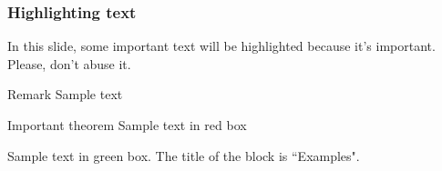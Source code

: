 \documentclass{beamer}
\begin{document}
	
	
	
\begin{frame}	
\frametitle{Highlighting text}
%
In this slide, some important text will be
\alert{highlighted} because it's important.
Please, don't abuse it.

\begin{block}{Remark}
Sample text
\end{block}

\begin{alertblock}{Important theorem}
Sample text in red box
\end{alertblock}

\begin{examples}
Sample text in green box. The title of the block is ``Examples".
\end{examples}
\end{frame}
\end{document}
